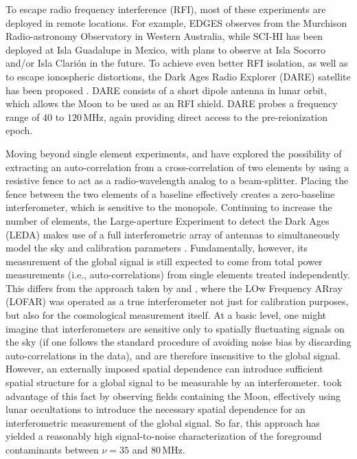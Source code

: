\documentclass[twocolumn,apj,numberedappendix]{emulateapj}
\begin{document}
To escape radio frequency interference (RFI), most of these experiments are deployed in remote locations. For example, EDGES observes from the Murchison Radio-astronomy Observatory in Western Australia, while SCI-HI has been deployed at Isla Guadalupe in Mexico, with plans to observe at Isla Socorro and/or Isla Clari\'{o}n in the future.  To achieve even better RFI isolation, as well as to escape ionospheric distortions, the Dark Ages Radio Explorer (DARE) satellite has been proposed \citep{BurnsDARE,DAREMCMC}.  DARE consists of a short dipole antenna in lunar orbit, which allows the Moon to be used as an RFI shield.  DARE probes a frequency range of $40$ to $120\,\textrm{MHz}$, again providing direct access to the pre-reionization epoch.

Moving beyond single element experiments, \citet{Mahesh_et_al2014} and \citet{Singh_et_al2015} have explored the possibility of extracting an auto-correlation from a cross-correlation of two elements by using a resistive fence to act as a radio-wavelength analog to a beam-splitter. Placing the fence between the two elements of a baseline effectively creates a zero-baseline interferometer, which is sensitive to the monopole. Continuing to increase the number of elements, the Large-aperture Experiment to detect the Dark Ages (LEDA) makes use of a full interferometric array of antennas to simultaneously model the sky and calibration parameters \citep{BernardiLEDA}.  Fundamentally, however, its measurement of the global signal is still expected to come from total power measurements (i.e., auto-correlations) from single elements treated independently.  This differs from the approach taken by \citet{McKinley_et_al2013} and \citet{VedanthamLOFAR2}, where the LOw Frequency ARray (LOFAR) was operated as a true interferometer not just for calibration purposes, but also for the cosmological measurement itself.  At a basic level, one might imagine that interferometers are sensitive only to spatially fluctuating signals on the sky (if one follows the standard procedure of avoiding noise bias by discarding auto-correlations in the data), and are therefore insensitive to the global signal.  However, an externally imposed spatial dependence can introduce sufficient spatial structure for a global signal to be measurable by an interferometer.  \citet{VedanthamLOFAR2} took advantage of this fact by observing fields containing the Moon, effectively using lunar occultations to introduce the necessary spatial dependence for an interferometric measurement of the global signal.  So far, this approach has yielded a reasonably high signal-to-noise characterization of the foreground contaminants between $\nu =35$ and $80\,\textrm{MHz}$.
\end{document}
